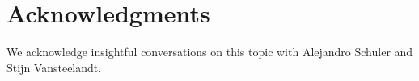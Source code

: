 
\section*{Acknowledgments}

We acknowledge insightful conversations on this topic with Alejandro Schuler and Stijn Vansteelandt.
